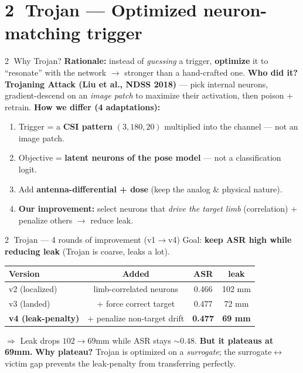 \documentclass[aspectratio=169,10pt]{beamer}
\newcommand{\good}[1]{\textcolor{good}{\textbf{#1}}}
\newcommand{\acc}[1]{\textcolor{accent}{\textbf{#1}}}
\begin{document}
\section{\textcircled{2} Trojan --- Optimized neuron-matching trigger}

\begin{frame}{\textcircled{2} Why Trojan?}
  \textbf{Rationale:} instead of \emph{guessing} a trigger, \acc{optimize} it to ``resonate'' with the network $\to$ stronger than a hand-crafted one.
  \vfill
  \textbf{Who did it?} \textbf{Trojaning Attack (Liu et al., NDSS 2018)} --- pick internal neurons, gradient-descend on an \emph{image patch} to maximize their activation, then poison + retrain.
  \vfill
  \textbf{How we differ (4 adaptations):}
  \begin{enumerate}
    \item Trigger = a \textbf{CSI pattern} $(3,180,20)$ multiplied into the channel --- not an image patch.
    \item Objective = \textbf{latent neurons of the pose model} --- not a classification logit.
    \item Add \textbf{antenna-differential + dose} (keep the analog \& physical nature).
    \item \acc{Our improvement:} select neurons that \emph{drive the target limb} (correlation) + penalize others $\to$ reduce leak.
  \end{enumerate}
\end{frame}

\begin{frame}{\textcircled{2} Trojan --- 4 rounds of improvement (v1$\to$v4)}
  Goal: \acc{keep ASR high while reducing leak} (Trojan is coarse, leaks a lot).
  \begin{center}
  \begin{tabular}{lccc}
    \toprule
    \textbf{Version} & \textbf{Added} & \textbf{ASR} & \textbf{leak} \\
    \midrule
    v2 (localized) & limb-correlated neurons & 0.466 & 102 mm \\
    v3 (landed)    & + force correct target  & 0.477 & 72 mm \\
    \textbf{v4 (leak-penalty)} & + penalize non-target drift & \textbf{0.477} & \good{69 mm} \\
    \bottomrule
  \end{tabular}
  \end{center}
  \vfill
  $\Rightarrow$ Leak drops $102\to69$mm while ASR stays $\sim0.48$. \textbf{But it plateaus at 69mm.}
  \vfill
  \textbf{Why plateau?} Trojan is optimized on a \emph{surrogate}; the surrogate$\leftrightarrow$victim gap prevents the leak-penalty from transferring perfectly.
\end{frame}
\end{document}
